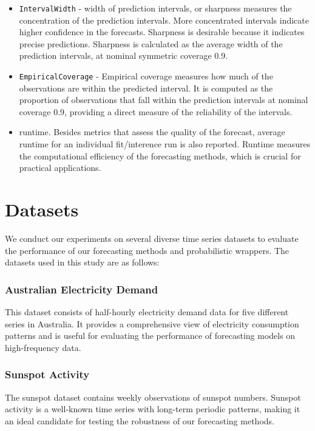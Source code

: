 \begin{itemize}
    \item \texttt{IntervalWidth} - width of prediction intervals, or sharpness measures the concentration of the prediction intervals. More concentrated intervals indicate higher confidence in the forecasts. Sharpness is desirable because it indicates precise predictions. Sharpness is calculated as the average width of the prediction intervals, at nominal symmetric coverage 0.9.
    \item \texttt{EmpiricalCoverage} - Empirical coverage measures how much of the observations are within the predicted interval. It is computed as the proportion of observations that fall within the prediction intervals at nominal coverage 0.9, providing a direct measure of the reliability of the intervals.
    \item runtime. Besides metrics that assess the quality of the forecast, average runtime for an individual fit/interence run is also reported. Runtime measures the computational efficiency of the forecasting methods, which is crucial for practical applications.
 
\end{itemize}


\section{Datasets} \label{datasets}
We conduct our experiments on several diverse time series datasets to evaluate the performance of our forecasting methods and probabilistic wrappers. The datasets used in this study are as follows:

\subsubsection{Australian Electricity Demand}
This dataset consists of half-hourly electricity demand data for five different series in Australia. It provides a comprehensive view of electricity consumption patterns and is useful for evaluating the performance of forecasting models on high-frequency data.

\subsubsection{Sunspot Activity}
The sunspot dataset contains weekly observations of sunspot numbers. Sunspot activity is a well-known time series with long-term periodic patterns, making it an ideal candidate for testing the robustness of our forecasting methods.

